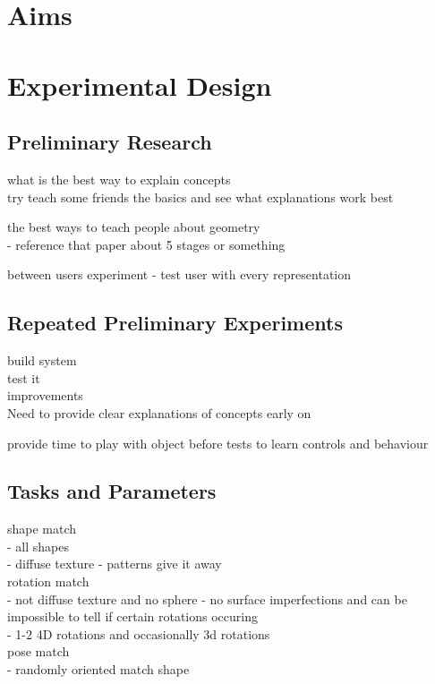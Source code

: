 \documentclass{l4proj}
\begin{document}
\section{Aims} 

\section{Experimental Design}

\subsection{Preliminary Research}

what is the best way to explain concepts\\
try teach some friends the basics and see what explanations work best

the best ways to teach people about geometry\\
 - reference that paper about 5 stages or something

between users experiment
 - test user with every representation

\subsection{Repeated Preliminary Experiments}

build system\\
test it\\
improvements\\

Need to provide clear explanations of concepts early on

provide time to play with object before tests to learn controls and behaviour

\subsection{Tasks and Parameters}

shape match\\
 - all shapes\\
 - diffuse texture - patterns give it away\\
rotation match\\
 - not diffuse texture and no sphere - no surface imperfections and can be impossible to tell if certain rotations occuring\\
 - 1-2 4D rotations and occasionally 3d rotations\\
pose match\\
 - randomly oriented match shape
\end{document}

